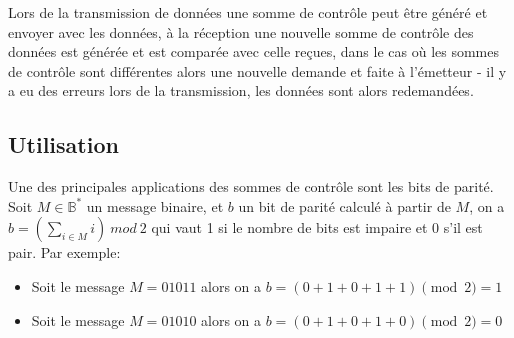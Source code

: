 \documentclass[a4paper, 12pt]{article}
\begin{document}
		Lors de la transmission de données une somme de contrôle peut être généré et
		envoyer avec les données, à la réception une nouvelle somme de contrôle des
		données est générée et est comparée avec celle reçues, dans le cas où les sommes
		de contrôle sont différentes alors une nouvelle demande et faite à l'émetteur - il
		y a eu des erreurs lors de la transmission, les données sont alors redemandées.

		\subsection{Utilisation}
		Une des principales applications des sommes de contrôle sont les bits de parité.
		Soit $M \in \mathbb{B}^*$ un message binaire, et $b$ un bit de parité calculé à
		partir de $M$, on a $b=(\sum_{i \in M}i) \ mod \ {2}$ qui vaut 1 si le nombre de bits
		est impaire et 0 s'il est pair.
		Par exemple:
		\begin{itemize}
			\item Soit le message $M=01011$ alors on a $b=(0+1+0+1+1) \pmod{2}=1$
			\item Soit le message $M=01010$ alors on a $b=(0+1+0+1+0) \pmod{2}=0$
		\end{itemize}
\end{document}

